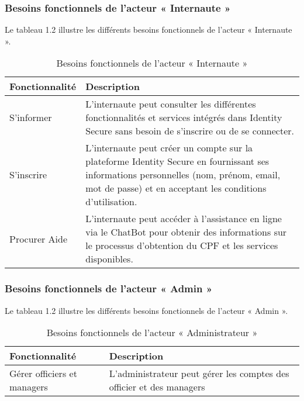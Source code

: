 \subsubsection{Besoins fonctionnels de l'acteur « Internaute »}

Le tableau 1.2 illustre les différents besoins fonctionnels de l'acteur « Internaute ».

\begin{table}[H]
\centering
\caption{ \centering Besoins fonctionnels de l'acteur « Internaute »}
\label{tab:backlog:ch1:1}
\begin{tabular}
{| >{\centering\arraybackslash}p{4.2cm} | >{\centering\arraybackslash}p{12.5cm} |}
\rowcolor{gray!30} %
\hline \textbf{Fonctionnalité} & \textbf{Description}\\
\hline  S'informer &  L'internaute peut consulter les différentes fonctionnalités et services intégrés dans Identity Secure sans besoin de s'inscrire ou de se connecter. \\
\hline S'inscrire &  L'internaute peut créer un compte sur la plateforme Identity Secure en fournissant ses informations personnelles (nom, prénom, email, mot de passe) et en acceptant les conditions d'utilisation. \\
\hline Procurer Aide &  L'internaute peut accéder à l'assistance en ligne via le ChatBot pour obtenir des informations sur le processus d'obtention du CPF et les services disponibles. \\
\hline
\end{tabular}
\end{table}



\subsubsection{Besoins fonctionnels de l'acteur « Admin »}

Le tableau 1.2 illustre les différents besoins fonctionnels de l'acteur « Admin ».

\begin{table}[H]
\centering
\caption{ \centering Besoins fonctionnels de l'acteur « Administrateur »}
\label{tab:backlog:ch1:1}
\begin{tabular}
{| >{\centering\arraybackslash}p{5cm} | >{\centering\arraybackslash}p{12.5cm} |}
\rowcolor{gray!30} %
\hline \textbf{Fonctionnalité} & \textbf{Description}\\
\hline Gérer officiers et managers &  L'administrateur peut gérer les comptes des officier et des managers \\
\hline
\end{tabular}
\end{table}







